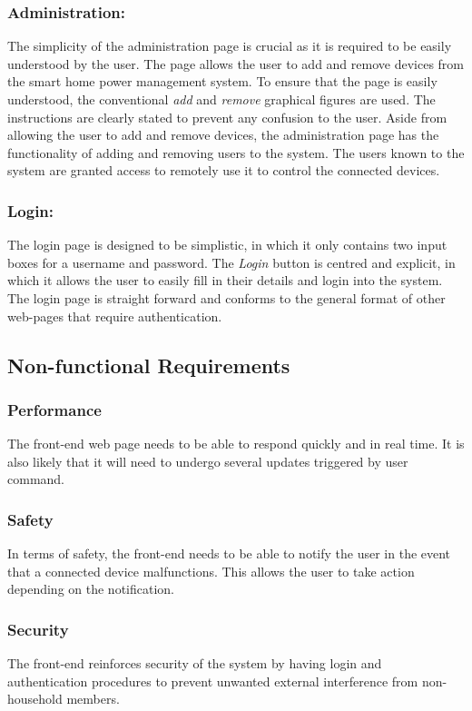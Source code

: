 \documentclass[10pt,twocolumn]{witseiepaper}
\begin{document}
	\subsubsection{Administration:}
	The simplicity of the administration page is crucial as it is required to be easily understood by the user. The page allows the user to add and remove devices from the smart home power management system. To ensure that the page is easily understood, the conventional \textit{add} and \textit{remove} graphical figures are used. The instructions are clearly stated to prevent any confusion to the user. Aside from allowing the user to add and remove devices, the administration page has the functionality of adding and removing users to the system. The users known to the system are granted access to remotely use it to control the connected devices.
	
	\subsubsection{Login:}
	The login page is designed to be simplistic, in which it only contains two input boxes for a username and password. The \textit{Login} button is centred and explicit, in which it allows the user to easily fill in their details and login into the system. The login page is straight forward and conforms to the general format of other web-pages that require authentication.
	
	\subsection{Non-functional Requirements}
	\subsubsection{Performance}
	The front-end web page needs to be able to respond quickly and in real time. It is also likely that it will need to undergo several updates triggered by user command.
	\subsubsection{Safety}
	In terms of safety, the front-end needs to be able to notify the user in the event that a connected device malfunctions. This allows the user to take action depending on the notification.
	\subsubsection{Security}
	The front-end reinforces security of the system by having login and authentication procedures to prevent unwanted external interference from non-household members.
\end{document}
